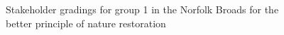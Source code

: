 \documentclass[
  12pt,
  letterpaper,
  DIV=11,
  numbers=noendperiod]{scrartcl}
\begin{document}
\begin{figure}[H]


\caption{\label{fig-BroadsBetterG1}Stakeholder gradings for group 1 in
the Norfolk Broads for the better principle of nature restoration}

\end{figure}%
\end{document}
